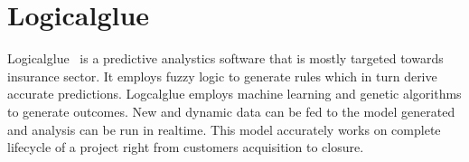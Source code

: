 \section{Logicalglue}

Logicalglue~\cite{hid-sp18-413-logicalglue} is a predictive analystics software
that is mostly targeted towards insurance sector. It employs fuzzy logic to
generate rules which in turn derive accurate predictions. Logcalglue employs
machine learning and genetic algorithms to generate outcomes. New and dynamic
data can be fed to the model generated and analysis can be run in realtime. This
model accurately works on complete lifecycle of a project right from customers
acquisition to closure.
